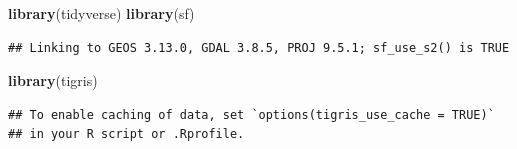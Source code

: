 \documentclass[
]{article}
\newenvironment{Shaded}{\begin{snugshade}}{\end{snugshade}}
\newcommand{\FunctionTok}[1]{\textcolor[rgb]{0.13,0.29,0.53}{\textbf{#1}}}
\newcommand{\NormalTok}[1]{#1}
\begin{document}
\begin{Shaded}
\begin{Highlighting}[]
\FunctionTok{library}\NormalTok{(tidyverse)}
\FunctionTok{library}\NormalTok{(sf)}
\end{Highlighting}
\end{Shaded}

\begin{verbatim}
## Linking to GEOS 3.13.0, GDAL 3.8.5, PROJ 9.5.1; sf_use_s2() is TRUE
\end{verbatim}

\begin{Shaded}
\begin{Highlighting}[]
\FunctionTok{library}\NormalTok{(tigris)}
\end{Highlighting}
\end{Shaded}

\begin{verbatim}
## To enable caching of data, set `options(tigris_use_cache = TRUE)`
## in your R script or .Rprofile.
\end{verbatim}
\end{document}
